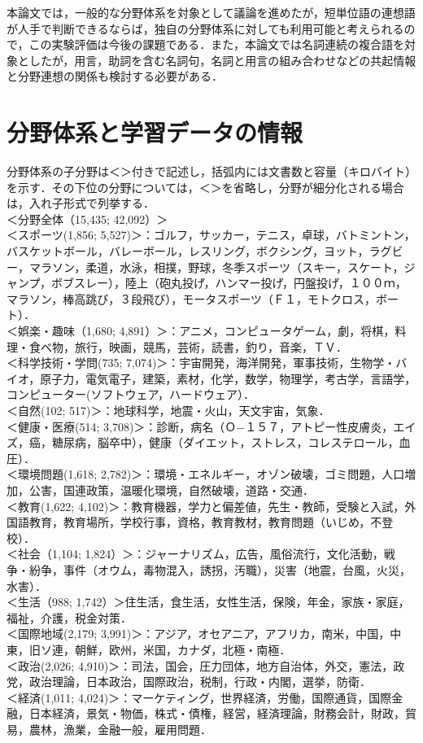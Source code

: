 本論文では，一般的な分野体系を対象として議論を進めたが，短単位語の連想語が人手で判断できるならば，独自の分野体系\cite{伊藤他1993,福田他1998}に対しても利用可能と考えられるので，この実験評価は今後の課題である．また，本論文では名詞連続の複合語を対象としたが，用言，助詞を含む名詞句，名詞と用言の組み合わせなどの共起情報\cite{湯浅他1995,山田他1998}と分野連想の関係も検討する必要がある．




\appendix
\section{分野体系と学習データの情報}

分野体系の子分野は＜＞付きで記述し，括弧内には文書数と容量（キロバイト）を示す．その下位の分野については，＜＞を省略し，分野が細分化される場合は，入れ子形式で列挙する．\\
＜分野全体（15,435; 42,092）＞\\
＜スポーツ(1,856; 5,527)＞：ゴルフ，サッカー，テニス，卓球，バトミントン，バスケットボール，バレーボール，レスリング，ボクシング，ヨット，ラグビー，マラソン，柔道，水泳，相撲，野球，冬季スポーツ（スキー，スケート，ジャンプ，ボブスレー），陸上（砲丸投げ，ハンマー投げ，円盤投げ，１００ｍ，マラソン，棒高跳び，３段飛び），モータスポーツ（Ｆ１，モトクロス，ボート）．\\
＜娯楽・趣味（1,680; 4,891）＞：アニメ，コンピュータゲーム，劇，将棋，料理・食べ物，旅行，映画，競馬，芸術，読書，釣り，音楽，ＴＶ．\\
＜科学技術・学問(735; 7,074)＞：宇宙開発，海洋開発，軍事技術，生物学・バイオ，原子力，電気電子，建築，素材，化学，数学，物理学，考古学，言語学，コンピューター(ソフトウェア，ハードウェア）．\\
＜自然(102; 517)＞：地球科学，地震・火山，天文宇宙，気象．\\
＜健康・医療(514; 3,708)＞：診断，病名（Ｏ−１５７，アトピー性皮膚炎，エイズ，癌，糖尿病，脳卒中），健康（ダイエット，ストレス，コレステロール，血圧）．\\
＜環境問題(1,618; 2,782)＞：環境・エネルギー，オゾン破壊，ゴミ問題，人口増加，公害，国連政策，温暖化環境，自然破壊，道路・交通．\\
＜教育(1,622; 4,102)＞：教育機器，学力と偏差値，先生・教師，受験と入試，外国語教育，教育場所，学校行事，資格，教育教材，教育問題（いじめ，不登校）．\\
＜社会（1,104; 1,824）＞：ジャーナリズム，広告，風俗流行，文化活動，戦争・紛争，事件（オウム，毒物混入，誘拐，汚職），災害（地震，台風，火災，水害）．\\
＜生活（988; 1,742）＞住生活，食生活，女性生活，保険，年金，家族・家庭，福祉，介護，税金対策．\\
＜国際地域(2,179; 3,991)＞：アジア，オセアニア，アフリカ，南米，中国，中東，旧ソ連，朝鮮，欧州，米国，カナダ，北極・南極．\\
＜政治(2,026; 4,910)＞：司法，国会，圧力団体，地方自治体，外交，憲法，政党，政治理論，日本政治，国際政治，税制，行政・内閣，選挙，防衛．\\
＜経済(1,011; 4,024)＞：マーケティング，世界経済，労働，国際通貨，国際金融，日本経済，景気・物価，株式・債権，経営，経済理論，財務会計，財政，貿易，農林，漁業，金融一般，雇用問題．


